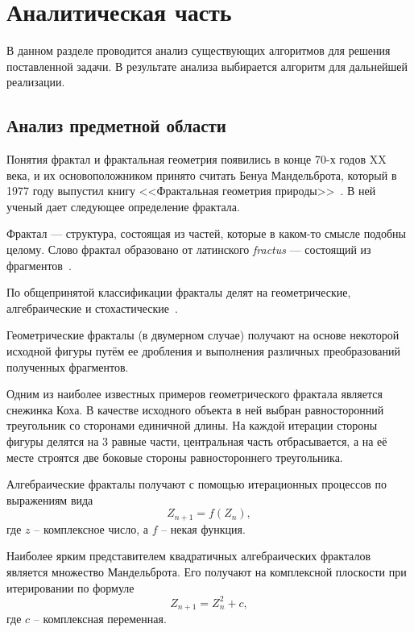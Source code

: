 \section{Аналитическая часть}

В данном разделе проводится анализ существующих алгоритмов для решения поставленной задачи. В результате анализа выбирается алгоритм для дальнейшей реализации.

\subsection{Анализ предметной области}
Понятия фрактал и фрактальная геометрия появились в конце 70-х годов XX века, и их основоположником
принято считать Бенуа Мандельброта, который в 1977 году выпустил книгу <<Фрактальная геометрия природы>>~\cite{mandelbrot}.
В ней ученый дает следующее определение фрактала.

Фрактал --- структура, состоящая из частей, которые в каком-то
смысле подобны целому. Слово фрактал образовано от латинского \textit{fractus} --- состоящий из фрагментов~\cite{mandelbrot}.

По общепринятой классификации фракталы делят на геометрические, алгебраические и стохастические~\cite{morozov}.

Геометрические фракталы (в двумерном случае) получают на основе некоторой исходной фигуры путём ее дробления и выполнения различных преобразований полученных фрагментов.

Одним из наиболее известных примеров геометрического фрактала является снежинка Коха. В качестве исходного объекта в ней выбран равносторонний треугольник со сторонами единичной длины.
На каждой итерации стороны фигуры делятся на 3 равные части, центральная часть отбрасывается, а на её месте строятся две боковые стороны равностороннего треугольника.


Алгебраические фракталы получают с помощью итерационных процессов по выражениям вида
\begin{displaymath}
  Z_{n+1} = f(Z_{n}),
\end{displaymath}
где $z$ -- комплексное число, а $f$ -- некая функция.

Наиболее ярким представителем квадратичных алгебраических фракталов является
множество Мандельброта. Его получают на комплексной плоскости при итерировании по формуле
\begin{equation}
  Z_{n+1} = Z_{n}^2 + c,
  \label{eq:mandelbrot}
\end{equation}
где $c$ -- комплексная переменная.

